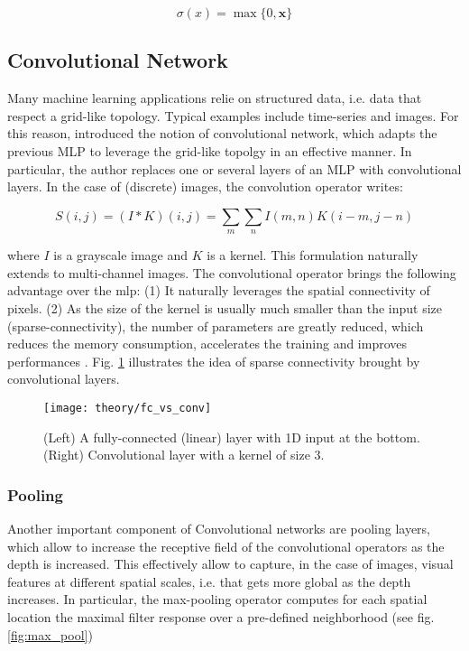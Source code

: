 \begin{equation}
\sigma(x) = \max \{0, \bm{x}\}
\end{equation}

\subsection{Convolutional Network}
Many machine learning applications relie on structured data, i.e. data that respect a grid-like topology.
Typical examples include time-series and images.
For this reason, \cite{lecun95} introduced the notion of convolutional network, which adapts the previous MLP to leverage the grid-like topolgy in an effective manner.
In particular, the author replaces one or several layers of an MLP with convolutional layers.
In the case of (discrete) images, the convolution operator writes:

\begin{equation}
S(i,j) = (I * K)(i,j) = \sum_{m} \sum_{n} I(m,n) K(i-m, j-n)
\end{equation}

where $I$ is a grayscale image and $K$ is a kernel.
This formulation naturally extends to multi-channel images.
The convolutional operator brings the following advantage over the \gls{mlp}: (1) It naturally leverages the spatial connectivity of pixels.
(2) As the size of the kernel is usually much smaller than the input size (sparse-connectivity), the number of parameters are greatly reduced, which reduces the memory consumption, accelerates the training and improves performances \cite{lecun95}.
Fig. \ref{fig:cnn_con} illustrates the idea of sparse connectivity brought by convolutional layers.

\begin{figure}[!htpb]
  \texttt{[image: theory/fc\_vs\_conv]}
  \caption{(Left) A fully-connected (linear) layer with 1D input at the bottom. (Right) Convolutional layer with a kernel of size 3.}
  \label{fig:cnn_con}
\end{figure}

\subsubsection{Pooling}

Another important component of Convolutional networks are pooling layers, which allow to increase the receptive field of the convolutional operators as the depth is increased.
This effectively allow to capture, in the case of images, visual features at different spatial scales, i.e. that gets more global as the depth increases.
In particular, the max-pooling operator computes for each spatial location the maximal filter response over a pre-defined neighborhood (see fig. \ref{fig:max_pool})

